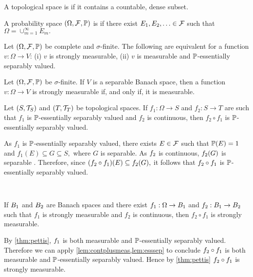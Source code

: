 A topological space is  if it contains a countable, dense subset.
\ede

A probability space $\OFP$ is  if there exist $E_1,E_2,\ldots \in \mathcal F$ such that $\Omega = \cup_{m=1}^\infty E_m.$
\ede

\label{thm:pettis}
Let $\OFP$ be complete and $\sigma$-finite. The following are equivalent for a function $v:\Omega \rightarrow V$:
(i) $v$ is  strongly measurable,
(ii) $v$ is measurable and $\mathbb P$-essentially separably valued.
\enth

Let $\OFP$ be $\sigma$-finite. If $V$ is a separable Banach space, then a function $v:\Omega\rightarrow V$ is strongly measurable if, and only if, it is measurable.\label{cor:pettis}
\eco

Let $\mleft(S,\TS\mright)$ and $\mleft(T,\TopT\mright)$ be topological spaces. If $f_1:\Omega \rightarrow S$ and $f_2:S\rightarrow T$ are such that $f_1$ is $\mathbb P$-essentially separably valued and $f_2$ is continuous, then $f_2\circ f_1$ is $\mathbb P$-essentially separably valued.\label{lem:esssep}
\ele

As $f_1$ is $\mathbb P$-essentially separably valued, there exists $E \in \mathcal F$ such that $\mathbb P(E) = 1$ and $f_1(E) \subseteq G \subseteq S,$ where $G$ is separable. As $f_{2}$ is continuous, $f_{2}(G)$ is separable \cite[Theorem 16.4(a)]{Wi:70}. Therefore, since $\mleft(\ft \circ\fo\mright)(E) \subseteq \ft(G),$ it follows that $f_{2}\circ f_{1}$ is $\mathbb P$-essentially separably valued.
\epf



\label{lem:contplusstrong}

\

\noindent If $B_{1}$ and $B_{2}$ are Banach spaces and there exist $f_1:\Omega \rightarrow B_{1}$ and $f_2:B_{1}\rightarrow B_{2}$ such that $f_1$ is strongly measurable and $f_2$ is continuous, then $f_2\circ f_1$ is strongly measurable.
\ele

By \cref{thm:pettis}, $f_{1}$ is both measurable and $\mathbb P$-essentially separably valued. Therefore we can apply \cref{lem:contplusmeas,lem:esssep} to conclude $f_{2} \circ f_{1}$ is both measurable and $\mathbb P$-essentially separably valued. Hence by \cref{thm:pettis} $f_{2}\circ f_{1}$ is strongly measurable.
\epf

